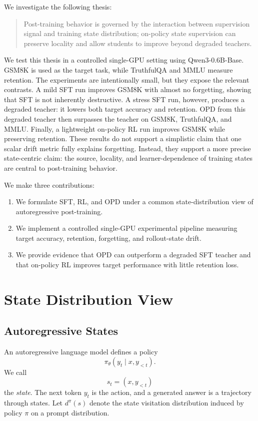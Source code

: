 \documentclass{article}
\begin{document}
We investigate the following thesis:
\begin{quote}
Post-training behavior is governed by the interaction between supervision signal
and training state distribution; on-policy state supervision can preserve
locality and allow students to improve beyond degraded teachers.
\end{quote}

We test this thesis in a controlled single-GPU setting using Qwen3-0.6B-Base.
GSM8K is used as the target task, while TruthfulQA and MMLU measure retention.
The experiments are intentionally small, but they expose the relevant contrasts.
A mild SFT run improves GSM8K with almost no forgetting, showing that SFT is not
inherently destructive. A stress SFT run, however, produces a degraded teacher:
it lowers both target accuracy and retention. OPD from this degraded teacher
then surpasses the teacher on GSM8K, TruthfulQA, and MMLU. Finally, a lightweight
on-policy RL run improves GSM8K while preserving retention. These results do not
support a simplistic claim that one scalar drift metric fully explains
forgetting. Instead, they support a more precise state-centric claim: the source,
locality, and learner-dependence of training states are central to post-training
behavior.

We make three contributions:
\begin{enumerate}[leftmargin=*]
    \item We formulate SFT, RL, and OPD under a common state-distribution view of
    autoregressive post-training.
    \item We implement a controlled single-GPU experimental pipeline measuring
    target accuracy, retention, forgetting, and rollout-state drift.
    \item We provide evidence that OPD can outperform a degraded SFT teacher and
    that on-policy RL improves target performance with little retention loss.
\end{enumerate}

\section{State Distribution View}

\subsection{Autoregressive States}

An autoregressive language model defines a policy
\begin{equation}
    \pi_\theta(y_t \mid x, y_{<t}).
\end{equation}
We call
\begin{equation}
    s_t = (x, y_{<t})
\end{equation}
the \emph{state}. The next token $y_t$ is the action, and a generated answer is a
trajectory through states. Let $d^\pi(s)$ denote the state visitation
distribution induced by policy $\pi$ on a prompt distribution.
\end{document}
